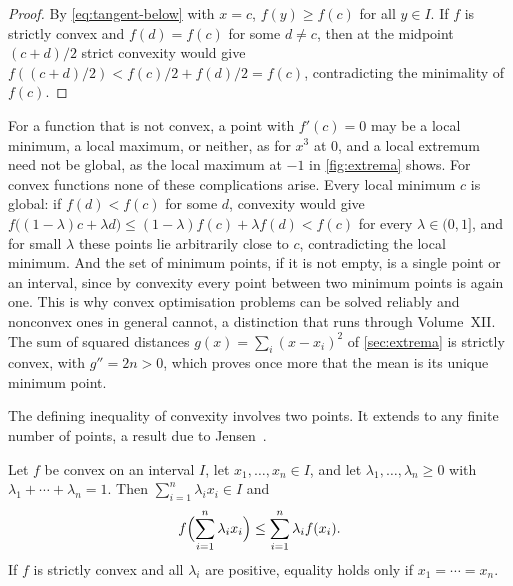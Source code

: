 \begin{proof}
By \eqref{eq:tangent-below} with $x=c$, $f(y)\ge f(c)$ for all $y\in I$. If $f$ is strictly convex and $f(d)=f(c)$ for some $d\ne c$, then at the midpoint $(c+d)/2$ strict convexity would give $f((c+d)/2)<f(c)/2+f(d)/2=f(c)$, contradicting the minimality of $f(c)$.
\end{proof}

For a function that is not convex, a point with $f'(c)=0$ may be a local minimum, a local maximum, or neither, as for $x^3$ at $0$, and a local extremum need not be global, as the local maximum at $-1$ in \cref{fig:extrema} shows. For convex functions none of these complications arise. Every local minimum $c$ is global: if $f(d)<f(c)$ for some $d$, convexity would give $f\bigl((1-\lambda)c+\lambda d\bigr)\le(1-\lambda)f(c)+\lambda f(d)<f(c)$ for every $\lambda\in(0,1]$, and for small $\lambda$ these points lie arbitrarily close to $c$, contradicting the local minimum. And the set of minimum points, if it is not empty, is a single point or an interval, since by convexity every point between two minimum points is again one. This is why convex optimisation problems can be solved reliably and nonconvex ones in general cannot, a distinction that runs through Volume~XII. The sum of squared distances $g(x)=\sum_i(x-x_i)^2$ of \cref{sec:extrema} is strictly convex, with $g''=2n>0$, which proves once more that the mean is its unique minimum point.

The defining inequality of convexity involves two points. It extends to any finite number of points, a result due to Jensen~\cite{jensen1906}.

\begin{theorem}
\label{thm:jensen}
Let $f$ be convex on an interval $I$, let $x_1,\ldots,x_n\in I$, and let $\lambda_1,\ldots,\lambda_n\ge0$ with $\lambda_1+\cdots+\lambda_n=1$. Then $\sum_{i=1}^n\lambda_ix_i\in I$ and
\[
f\Bigl(\sum_{i=1}^n\lambda_ix_i\Bigr)\le\sum_{i=1}^n\lambda_if(x_i) .
\]
If $f$ is strictly convex and all $\lambda_i$ are positive, equality holds only if $x_1=\cdots=x_n$.
\end{theorem}

